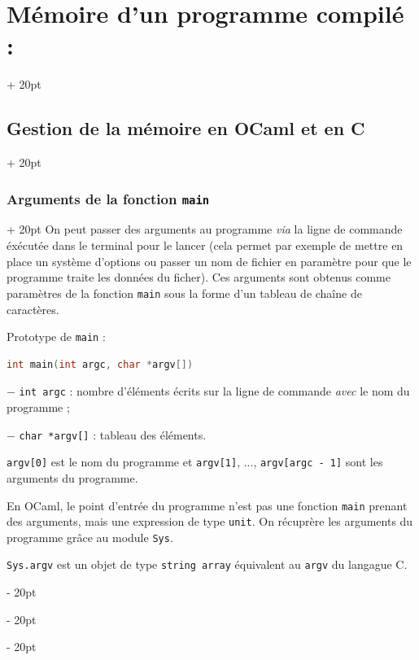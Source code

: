 \documentclass[a4paper, 12pt, twoside]{article}
\newcommand{\ind}[1][20pt]{\advance\leftskip + #1}
\newcommand{\deind}[1][20pt]{\advance\leftskip - #1}
\newenvironment{indentedenv}[1][20pt]{\par \ind[#1]}{\par \deind}
\newenvironment{indt}[2][20pt]{#2 \begin{indentedenv}[#1]}{\end{indentedenv}} %
\begin{document}
\begin{indt}{\section{Mémoire d'un programme compilé :}}
\begin{indt}{\subsection{Gestion de la mémoire en OCaml et en C}}
            \begin{indt}{\subsubsection{Arguments de la fonction \texttt{main}}}
                On peut passer des arguments au programme \textit{via} la ligne de commande éxécutée dans le terminal pour le lancer (cela permet par exemple de mettre en place un système d'options ou passer un nom de fichier en paramètre pour que le programme traite les données du ficher). Ces arguments sont obtenus comme paramètres de la fonction \texttt{main} sous la forme d'un tableau de cha\^ine de caractères.
                
                \vspace{6pt}
                
                Prototype de \texttt{main} :
                
                \begin{lstlisting}[language=C, xleftmargin=80pt]
int main(int argc, char *argv[])\end{lstlisting}
                
                $-$ \texttt{int argc} : nombre d'éléments écrits sur la ligne de commande \textit{avec} le nom du programme ;
                
                $-$ \texttt{char *argv[]} : tableau des éléments.
                
                \vspace{12pt}
                
                \texttt{argv[0]} est le nom du programme et \texttt{argv[1]}, ..., \texttt{argv[argc - 1]} sont les arguments du programme.
                
                \vspace{12pt}
                
                En OCaml, le point d'entrée du programme n'est pas une fonction \texttt{main} prenant des arguments, mais une expression de type \texttt{unit}. On récuprère les arguments du programme grâce au module \texttt{Sys}.
                
                \texttt{Sys.argv} est un objet de type \texttt{string array} équivalent au \texttt{argv} du langague C.
            \end{indt}
            
        \end{indt}
        
    \end{indt}
    
\end{document}

